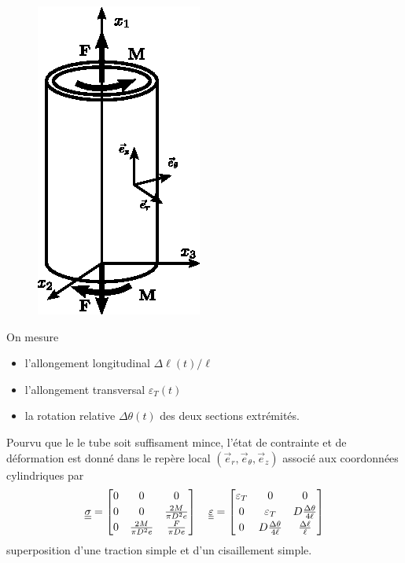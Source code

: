 \begin{figure}
    \begin{center}
        \includegraphics{../images/T1_Ch04-0008}
    \end{center}
\end{figure}
On mesure
\begin{itemize}
    \item l'allongement longitudinal $\Delta \ell(t)/\ell$
    \item l'allongement transversal $\varepsilon_T(t)$
    \item la rotation relative $\Delta \theta(t)$ des deux sections extrémités.
\end{itemize}
Pourvu que le le tube soit suffisament mince, l'état de contrainte et de déformation est donné dans le repère local $(\vec{e}_r, \vec{e}_{\theta}, \vec{e}_z)$ associé aux coordonnées cylindriques par
\begin{equation}
    \underline{\underline{\sigma}} =
    \begin{bmatrix}
        0 & 0 & 0 \\[2pt]
        0 & 0 & \frac{2M}{\pi D^2 e} \\[2pt]
        0 & \frac{2M}{\pi D^2 e} & \frac{F}{\pi D e}
    \end{bmatrix}
    \quad
    \underline{\underline{\varepsilon}} = 
    \begin{bmatrix}
        \varepsilon_T & 0 & 0 \\[2pt]
        0 & \varepsilon_T & D \frac{\Delta \theta}{4 \ell} \\[2pt]
        0 & D \frac{\Delta \theta}{4\ell} & \frac{\Delta \ell}{\ell}
    \end{bmatrix}
    \label{eq:Ch04-036}
\end{equation}
superposition d'une traction simple et d'un cisaillement simple.


